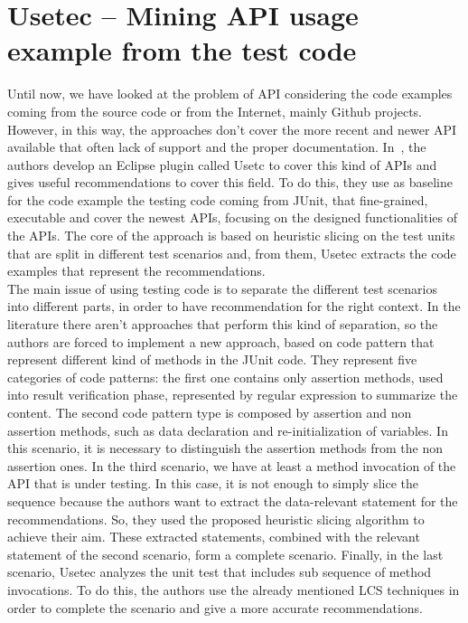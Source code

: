 \section{Usetec -- Mining API usage example 
from the test code}
Until now, we have looked at the problem of API considering the code examples coming from the source code or from the Internet, mainly Github projects. However, in this way, the approaches don't cover the more recent and newer API available that often lack of support and the proper documentation. In~\cite{zhu_mining_2014}, the authors develop an Eclipse plugin called Usetc to cover this kind of APIs and gives useful recommendations to cover this field. To do this, they use as baseline for the code example the testing code coming from JUnit, that fine-grained, executable and cover the newest APIs, focusing on the designed functionalities of the APIs. The core of the approach is based on heuristic slicing on the test units that are split in different test scenarios and, from them, Usetec extracts the code examples that represent the recommendations. \\
The main issue of using testing code is to separate the different test scenarios into different parts, in order to have recommendation for the right context. In the literature there aren't approaches that perform this kind of separation, so the authors are forced to implement a new approach, based on code pattern that represent different kind of methods in the JUnit code. They represent five categories of code patterns: the first one contains only assertion methods, used into result verification phase, represented by regular expression to summarize the content. The second code pattern type is composed by assertion and non assertion methods, such as data declaration and re-initialization of variables. In this scenario, it is necessary to distinguish the assertion methods from the non assertion ones. In the third scenario, we have at least a method invocation of the API that is under testing. In this case, it is not enough to simply slice the sequence because the authors want to extract the data-relevant statement for the recommendations. So, they used the proposed heuristic slicing algorithm to achieve their aim. These extracted statements, combined with the relevant statement of the second scenario, form a complete scenario. Finally, in the last scenario, Usetec analyzes the unit test that includes sub sequence of method invocations. To do this, the authors use the already mentioned LCS techniques in order to complete the scenario and give a more accurate recommendations. \newline
